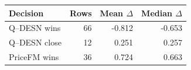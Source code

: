 \begin{tabular}{lrrr}
\toprule
Decision & Rows & Mean $\Delta$ & Median $\Delta$ \\
\midrule
Q--DESN wins & 66 & -0.812 & -0.653 \\
Q--DESN close & 12 & 0.251 & 0.257 \\
PriceFM wins & 36 & 0.724 & 0.663 \\
\bottomrule
\end{tabular}
